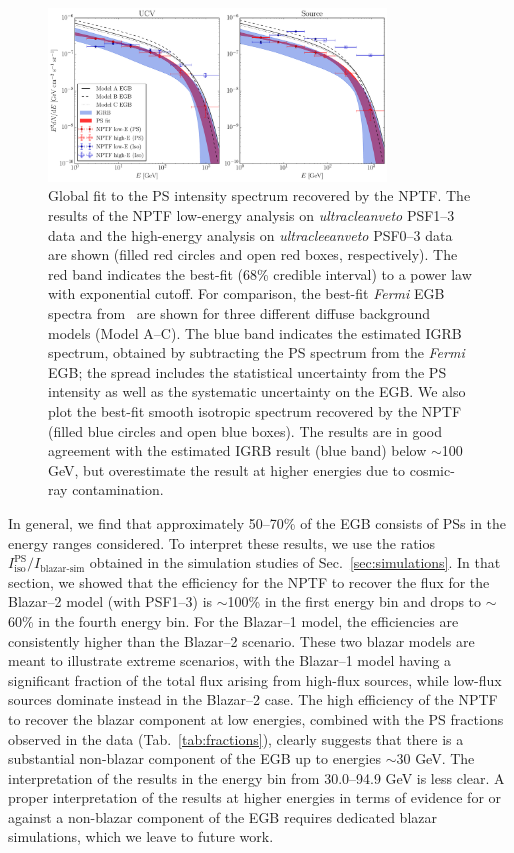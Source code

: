 \begin{figure}[!htbp] %
   \centering
   \includegraphics[width=0.8\textwidth]{ch-igrb/plots/spectra_new_simp.pdf} 
   \caption{Global fit to the PS intensity spectrum recovered by the NPTF. The results of the NPTF low-energy analysis on {\it ultracleanveto} PSF1--3 data and the high-energy analysis on {\it ultracleeanveto} PSF0--3 data are shown (filled red circles and open red boxes, respectively).  The red band indicates the best-fit (68\% credible interval) to a power law with exponential cutoff.  For comparison, the best-fit \emph{Fermi} EGB spectra from~\cite{Ackermann:2014usa} are shown for three different diffuse background models (Model A--C).  The blue band indicates the estimated IGRB spectrum, obtained by subtracting the PS spectrum from the \emph{Fermi} EGB; the spread includes the statistical uncertainty from the PS intensity as well as the systematic uncertainty on the EGB.  We also plot the best-fit smooth isotropic spectrum recovered by the NPTF (filled blue circles and open blue boxes).  The results are in good agreement with the estimated IGRB result (blue band) below $\sim$100 GeV, but overestimate the result at higher energies due to cosmic-ray contamination.  
    } 
   \label{fig:global}
\end{figure}


In general, we find that approximately 50--70\% of the EGB consists of PSs in the energy ranges considered.  To interpret these results, we use the ratios $I_\text{iso}^\text{PS} / I_\text{blazar-sim}$ obtained in the simulation studies of Sec.~\ref{sec:simulations}.  In that section, we showed that the efficiency for the NPTF to recover the flux for the Blazar--2 model (with PSF1--3) is 
$\sim$100\% in the first energy bin and drops to $\sim$60\% in the fourth energy bin.  For the Blazar--1 model, the efficiencies are consistently higher than the Blazar--2 scenario.  These two blazar models are meant to illustrate extreme scenarios, with the Blazar--1 model having a significant fraction of the total flux arising from high-flux sources, while low-flux sources dominate instead in the Blazar--2 case. 
The high efficiency of the NPTF to recover the blazar component at low energies, combined with the PS fractions observed in the data (Tab.~\ref{tab:fractions}), clearly suggests that there is a substantial non-blazar component of the EGB up to energies $\sim$30 GeV.   The interpretation of the results in the energy bin from 30.0--94.9 GeV is less clear.  A proper interpretation of the results at higher energies in terms of evidence for or against a non-blazar component of the EGB requires dedicated blazar simulations, which we leave to future work.  
 
